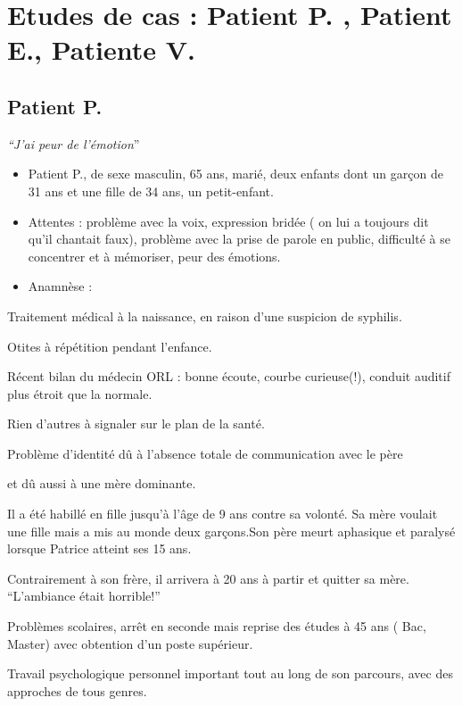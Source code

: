 \chapter{Etudes de cas : Patient P. , Patient E., Patiente V.}

\section{Patient P.}

\emph{``J'ai peur de l'émotion}''
\begin{itemize}
\item Patient P., de sexe masculin, 65 ans, marié, deux enfants dont un
garçon de 31 ans et une fille de 34 ans, un petit-enfant.
\item Attentes : problème avec la voix, expression bridée ( on lui a toujours
dit qu'il chantait faux), problème avec la prise de parole en public,
difficulté à se concentrer et à mémoriser, peur des émotions.
\item Anamnèse :
\end{itemize}
Traitement médical à la naissance, en raison d'une suspicion de syphilis.

Otites à répétition pendant l'enfance.

Récent bilan du médecin ORL : bonne écoute, courbe curieuse(!), conduit
auditif plus étroit que la normale.

Rien d'autres à signaler sur le plan de la santé.

Problème d'identité dû à l'absence totale de communication avec le
père 

et dû aussi à une mère dominante.

Il a été habillé en fille jusqu'à l'âge de 9 ans contre sa volonté.
Sa mère voulait une fille mais a mis au monde deux garçons.Son père
meurt aphasique et paralysé lorsque Patrice atteint ses 15 ans.

Contrairement à son frère, il arrivera à 20 ans à partir et quitter
sa mère. ``L'ambiance était horrible!''

Problèmes scolaires, arrêt en seconde mais reprise des études à 45
ans ( Bac, Master) avec obtention d'un poste supérieur.

Travail psychologique personnel important tout au long de son parcours,
avec des approches de tous genres.

